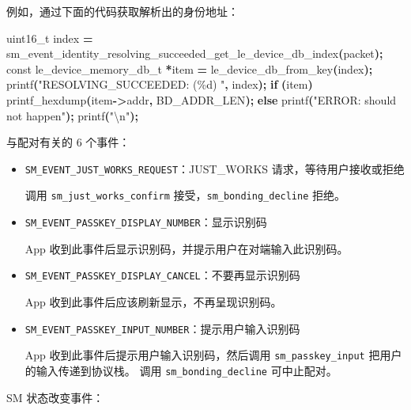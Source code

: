 \documentclass[
  12pt,
]{book}
\newenvironment{Shaded}{\begin{snugshade}}{\end{snugshade}}
\newcommand{\ControlFlowTok}[1]{\textcolor[rgb]{0.13,0.29,0.53}{\textbf{#1}}}
\newcommand{\DataTypeTok}[1]{\textcolor[rgb]{0.13,0.29,0.53}{#1}}
\newcommand{\NormalTok}[1]{#1}
\newcommand{\OperatorTok}[1]{\textcolor[rgb]{0.81,0.36,0.00}{\textbf{#1}}}
\newcommand{\SpecialCharTok}[1]{\textcolor[rgb]{0.00,0.00,0.00}{#1}}
\newcommand{\StringTok}[1]{\textcolor[rgb]{0.31,0.60,0.02}{#1}}
\begin{document}
\begin{itemize}
  例如，通过下面的代码获取解析出的身份地址：

\begin{Shaded}
\begin{Highlighting}[]
\DataTypeTok{uint16\_t}\NormalTok{ index }\OperatorTok{=}
\NormalTok{    sm\_event\_identity\_resolving\_succeeded\_get\_le\_device\_db\_index}\OperatorTok{(}\NormalTok{packet}\OperatorTok{);}
\DataTypeTok{const}\NormalTok{ le\_device\_memory\_db\_t }\OperatorTok{*}\NormalTok{item }\OperatorTok{=}
\NormalTok{    le\_device\_db\_from\_key}\OperatorTok{(}\NormalTok{index}\OperatorTok{);}
\NormalTok{printf}\OperatorTok{(}\StringTok{"RESOLVING\_SUCCEEDED: (\%d) "}\OperatorTok{,}\NormalTok{ index}\OperatorTok{);}
\ControlFlowTok{if} \OperatorTok{(}\NormalTok{item}\OperatorTok{)}
\NormalTok{    printf\_hexdump}\OperatorTok{(}\NormalTok{item}\OperatorTok{{-}\textgreater{}}\NormalTok{addr}\OperatorTok{,}\NormalTok{ BD\_ADDR\_LEN}\OperatorTok{);}
\ControlFlowTok{else}
\NormalTok{    printf}\OperatorTok{(}\StringTok{"ERROR: should not happen"}\OperatorTok{);}
\NormalTok{printf}\OperatorTok{(}\StringTok{"}\SpecialCharTok{\textbackslash{}n}\StringTok{"}\OperatorTok{);}
\end{Highlighting}
\end{Shaded}
\end{itemize}

与配对有关的 6 个事件：

\begin{itemize}
\item
  \texttt{SM\_EVENT\_JUST\_WORKS\_REQUEST}：JUST\_WORKS 请求，等待用户接收或拒绝

  调用 \texttt{sm\_just\_works\_confirm} 接受，\texttt{sm\_bonding\_decline} 拒绝。
\item
  \texttt{SM\_EVENT\_PASSKEY\_DISPLAY\_NUMBER}：显示识别码

  App 收到此事件后显示识别码，并提示用户在对端输入此识别码。
\item
  \texttt{SM\_EVENT\_PASSKEY\_DISPLAY\_CANCEL}：不要再显示识别码

  App 收到此事件后应该刷新显示，不再呈现识别码。
\item
  \texttt{SM\_EVENT\_PASSKEY\_INPUT\_NUMBER}：提示用户输入识别码

  App 收到此事件后提示用户输入识别码，然后调用 \texttt{sm\_passkey\_input} 把用户的输入传递到协议栈。
  调用 \texttt{sm\_bonding\_decline} 可中止配对。
\end{itemize}

SM 状态改变事件：
\end{document}
